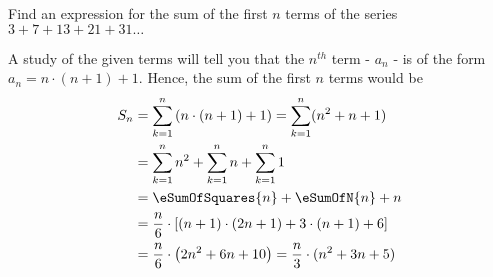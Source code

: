 
%
%
%
%
% 
% 

\question Find an expression for the sum of the first $n$ terms of the series 
$3 + 7 + 13 + 21 + 31 \ldots$

\insertQR{}

\ifprintanswers
\fi 

\begin{solution}
	A study of the given terms will tell you that the $n^{th}$ term - $a_n$ - is of the
	form $a_n = n\cdot(n+1) + 1$. Hence, the sum of the first $n$ terms would be
	\begin{align}
		S_n &= \sum_{k=1}^{n}\left(n\cdot(n+1)+1\right) = \sum_{k=1}^{n}(n^2+n + 1) \\
		&= \sum_{k=1}^{n}n^2 + \sum_{k=1}^{n}n + \sum_{k=1}^{n}1 \\
		&= \eSumOfSquares{n} + \eSumOfN{n} + n \\
		&= \dfrac{n}{6}\cdot\left[ (n+1)\cdot(2n+1) + 3\cdot(n+1) + 6 \right] \\
		&= \dfrac{n}{6}\cdot\left( 2n^2 + 6n + 10\right) = \dfrac{n}{3}\cdot(n^2+3n+5)
	\end{align}
\end{solution}
